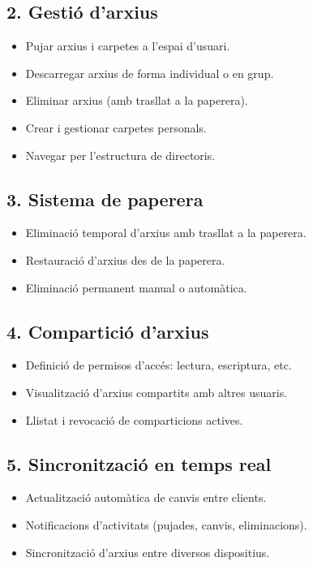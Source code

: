 \subsection{2. Gestió d'arxius}
\begin{itemize}
  \item Pujar arxius i carpetes a l'espai d'usuari.
  \item Descarregar arxius de forma individual o en grup.
  \item Eliminar arxius (amb trasllat a la paperera).
  \item Crear i gestionar carpetes personals.
  \item Navegar per l'estructura de directoris.
\end{itemize}

\subsection{3. Sistema de paperera}
\begin{itemize}
  \item Eliminació temporal d'arxius amb trasllat a la paperera.
  \item Restauració d'arxius des de la paperera.
  \item Eliminació permanent manual o automàtica.
\end{itemize}

\subsection{4. Compartició d'arxius}
\begin{itemize}
  \item Definició de permisos d'accés: lectura, escriptura, etc.
  \item Visualització d'arxius compartits amb altres usuaris.
  \item Llistat i revocació de comparticions actives.
\end{itemize}

\subsection{5. Sincronització en temps real}
\begin{itemize}
  \item Actualització automàtica de canvis entre clients.
  \item Notificacions d'activitats (pujades, canvis, eliminacions).
  \item Sincronització d'arxius entre diversos dispositius.
\end{itemize}

